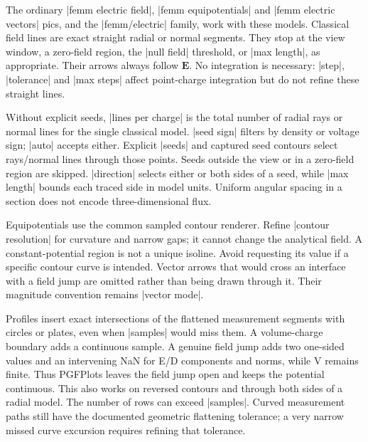 The ordinary |femm electric field|, |femm equipotentials| and
|femm electric vectors| pics, and the |femm/electric| family, work with these
models. Classical field lines are exact straight radial or normal segments.
They stop at the view window, a zero-field region, the |null field| threshold,
or |max length|, as appropriate. Their arrows always follow $\mathbf E$.
No integration is necessary: |step|, |tolerance| and |max steps| affect
point-charge integration but do not refine these straight lines.

Without explicit seeds, |lines per charge| is the total number of radial rays
or normal lines for the single classical model. |seed sign| filters by density
or voltage sign; |auto| accepts either. Explicit |seeds| and captured seed
contours select rays/normal lines through those points. Seeds outside the
view or in a zero-field region are skipped. |direction| selects either or both
sides of a seed, while |max length| bounds each traced side in model units.
Uniform angular spacing in a section does not encode three-dimensional flux.

Equipotentials use the common sampled contour renderer. Refine
|contour resolution| for curvature and narrow gaps; it cannot change the
analytical field. A constant-potential region is not a unique isoline.
Avoid requesting its value if a specific contour curve is intended. Vector
arrows that would cross an interface with a field jump are omitted rather than
being drawn through it. Their magnitude convention remains |vector mode|.

Profiles insert exact intersections of the flattened measurement segments with
circles or plates, even when |samples| would miss them. A volume-charge boundary
adds a continuous sample. A genuine field jump adds two one-sided values and
an intervening NaN for E/D components and norms, while V remains finite. Thus
PGFPlots leaves the field jump open and keeps the potential continuous. This
also works on reversed contours and through both sides of a radial model.
The number of rows can exceed |samples|. Curved measurement paths still have
the documented geometric flattening tolerance; a very narrow missed curve
excursion requires refining that tolerance.

